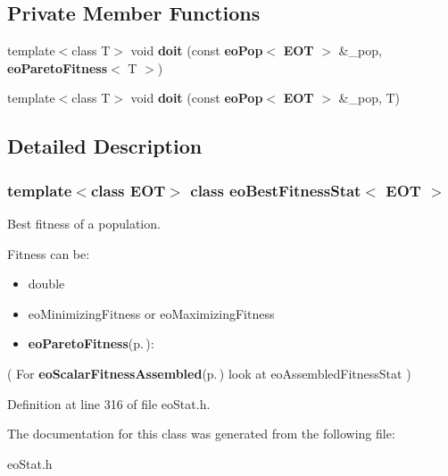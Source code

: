 \subsection*{Private Member Functions}
\begin{CompactItemize}
\item 
template$<$class T$>$ void {\bf doit} (const {\bf eo\-Pop}$<$ {\bf EOT} $>$ \&\_\-pop, {\bf eo\-Pareto\-Fitness}$<$ T $>$)\label{classeo_best_fitness_stat_d0}

\item 
template$<$class T$>$ void {\bf doit} (const {\bf eo\-Pop}$<$ {\bf EOT} $>$ \&\_\-pop, T)\label{classeo_best_fitness_stat_d1}

\end{CompactItemize}


\subsection{Detailed Description}
\subsubsection*{template$<$class EOT$>$ class eo\-Best\-Fitness\-Stat$<$ EOT $>$}

Best fitness of a population. 

Fitness can be:\begin{itemize}
\item double\item eo\-Minimizing\-Fitness or eo\-Maximizing\-Fitness\item {\bf eo\-Pareto\-Fitness}{\rm (p.\,\pageref{classeo_pareto_fitness})}:\end{itemize}


( For {\bf eo\-Scalar\-Fitness\-Assembled}{\rm (p.\,\pageref{classeo_scalar_fitness_assembled})} look at eo\-Assembled\-Fitness\-Stat ) 



Definition at line 316 of file eo\-Stat.h.

The documentation for this class was generated from the following file:\begin{CompactItemize}
\item 
eo\-Stat.h\end{CompactItemize}
